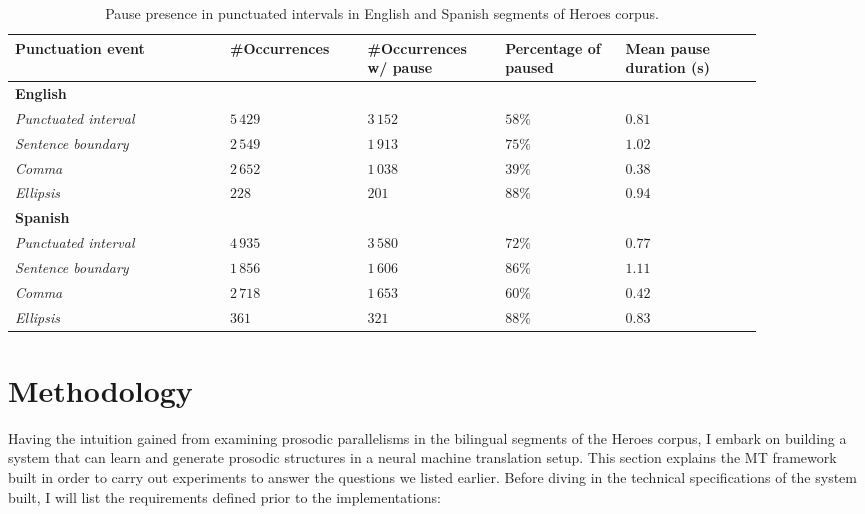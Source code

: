 \begin{table}[ht]
\centering
\begin{tabular}{>{\centering\arraybackslash} m{0.25\linewidth} >{\centering\arraybackslash} m{0.16\linewidth} >{\centering\arraybackslash} m{0.16\linewidth} >{\centering\arraybackslash} m{0.14\linewidth} >{\centering\arraybackslash} m{0.16\linewidth}}
\textbf{Punctuation event} & \textbf{\#Occurrences} & \textbf{\#Occurrences w/ pause} & \textbf{Percentage of paused} & \textbf{Mean pause duration (s)}\\ \hline
\textbf{English} & & & & \\
 \hline
\textit{Punctuated interval}      &  $5\,429$ & $3\,152$ & $58\%$ & $0.81$ \\
\textit{Sentence boundary}        &  $2\,549$  & $1\,913$ & $75\%$ & $1.02$ \\
\textit{Comma}                    &  $2\,652$ & $1\,038$ & $39\%$ & $0.38$  \\ 
\textit{Ellipsis}                 &  $228$ & $201$ & $88\%$ & $0.94$ \\ \hline
\textbf{Spanish} & & & & \\
 \hline
\textit{Punctuated interval}      &  $4\,935$ & $3\,580$ & $72\%$ & $0.77$\\
\textit{Sentence boundary}        &  $1\,856$  & $1\,606$ & $86\%$ & $1.11$\\
\textit{Comma}                    &  $2\,718$ & $1\,653$ & $60\%$ & $0.42$  \\ 
\textit{Ellipsis}                 &  $361$ & $321$ & $88\%$ & $0.83$ \\ \hline
\end{tabular}
\caption{\label{table:if_punctuation_then_pause}Pause presence in punctuated intervals in English and Spanish segments of Heroes corpus.}
\end{table}

\section{Methodology}
\label{transProse:methodology}

Having the intuition gained from examining prosodic parallelisms in the bilingual segments of the Heroes corpus, I embark on building a system that can learn and generate prosodic structures in a neural machine translation setup. This section explains the MT framework built in order to carry out experiments to answer the questions we listed earlier. Before diving in the technical specifications of the system built, I will list the requirements defined prior to the implementations:

